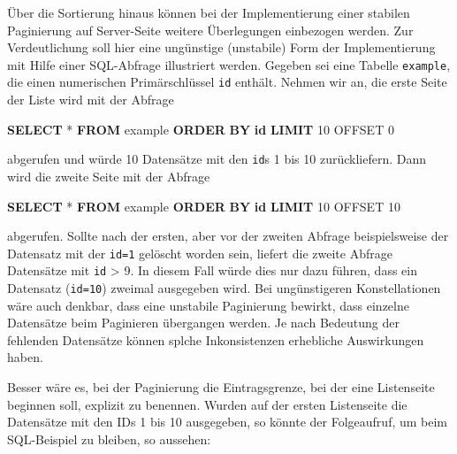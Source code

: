 \documentclass[,a4paper]{article}
\newenvironment{Shaded}{}{}
\newcommand{\KeywordTok}[1]{\textcolor[rgb]{0.00,0.44,0.13}{\textbf{{#1}}}}
\newcommand{\DecValTok}[1]{\textcolor[rgb]{0.25,0.63,0.44}{{#1}}}
\newcommand{\NormalTok}[1]{{#1}}
\begin{document}
Über die Sortierung hinaus können bei der Implementierung einer stabilen
Paginierung auf Server-Seite weitere Überlegungen einbezogen werden. Zur
Verdeutlichung soll hier eine ungünstige (unstabile) Form der
Implementierung mit Hilfe einer SQL-Abfrage illustriert werden. Gegeben
sei eine Tabelle \texttt{example}, die einen numerischen Primärschlüssel
\texttt{id} enthält. Nehmen wir an, die erste Seite der Liste wird mit
der Abfrage

\begin{Shaded}
\begin{Highlighting}[]
\KeywordTok{SELECT} \NormalTok{* }\KeywordTok{FROM} \NormalTok{example }\KeywordTok{ORDER} \KeywordTok{BY} \KeywordTok{id} \KeywordTok{LIMIT} \DecValTok{10} \NormalTok{OFFSET }\DecValTok{0}
\end{Highlighting}
\end{Shaded}

abgerufen und würde 10 Datensätze mit den \texttt{id}s 1 bis 10
zurückliefern. Dann wird die zweite Seite mit der Abfrage

\begin{Shaded}
\begin{Highlighting}[]
\KeywordTok{SELECT} \NormalTok{* }\KeywordTok{FROM} \NormalTok{example }\KeywordTok{ORDER} \KeywordTok{BY} \KeywordTok{id} \KeywordTok{LIMIT} \DecValTok{10} \NormalTok{OFFSET }\DecValTok{10}
\end{Highlighting}
\end{Shaded}

abgerufen. Sollte nach der ersten, aber vor der zweiten Abfrage
beispielsweise der Datensatz mit der \texttt{id=1} gelöscht worden sein,
liefert die zweite Abfrage Datensätze mit \texttt{id} \textgreater{} 9.
In diesem Fall würde dies nur dazu führen, dass ein Datensatz
(\texttt{id=10}) zweimal ausgegeben wird. Bei ungünstigeren
Konstellationen wäre auch denkbar, dass eine unstabile Paginierung
bewirkt, dass einzelne Datensätze beim Paginieren übergangen werden. Je
nach Bedeutung der fehlenden Datensätze können splche Inkonsistenzen
erhebliche Auswirkungen haben.

Besser wäre es, bei der Paginierung die Eintragsgrenze, bei der eine
Listenseite beginnen soll, explizit zu benennen. Wurden auf der ersten
Listenseite die Datensätze mit den IDs 1 bis 10 ausgegeben, so könnte
der Folgeaufruf, um beim SQL-Beispiel zu bleiben, so aussehen:
\end{document}
